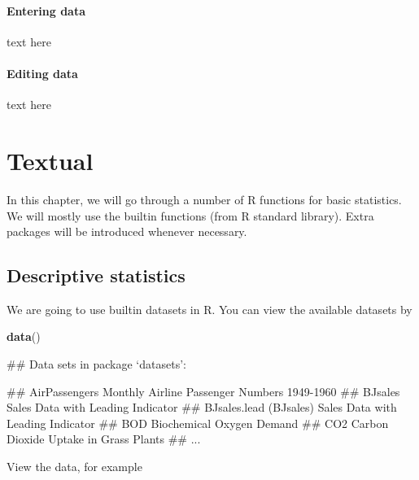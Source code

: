 \documentclass[]{book}
\newenvironment{Shaded}{\begin{snugshade}}{\end{snugshade}}
\newcommand{\KeywordTok}[1]{\textcolor[rgb]{0.13,0.29,0.53}{\textbf{#1}}}
\newcommand{\NormalTok}[1]{#1}
\theoremstyle{definition}
\theoremstyle{definition}
\theoremstyle{remark}
\begin{document}
\subsubsection{Entering data}\label{entering-data}

text here

\subsubsection{Editing data}\label{editing-data}

text here

\chapter{Textual}\label{textual}

In this chapter, we will go through a number of R functions for basic
statistics. We will mostly use the builtin functions (from R standard
library). Extra packages will be introduced whenever necessary.

\section{Descriptive statistics}\label{descriptive-statistics}

We are going to use builtin datasets in R. You can view the available
datasets by

\begin{Shaded}
\begin{Highlighting}[]
\KeywordTok{data}\NormalTok{()}
\end{Highlighting}
\end{Shaded}

\begin{Shaded}
\begin{Highlighting}[]
\NormalTok{## Data sets in package ‘datasets’:}

\NormalTok{## AirPassengers                     Monthly Airline Passenger Numbers 1949-1960}
\NormalTok{## BJsales                           Sales Data with Leading Indicator}
\NormalTok{## BJsales.lead (BJsales)            Sales Data with Leading Indicator}
\NormalTok{## BOD                               Biochemical Oxygen Demand}
\NormalTok{## CO2                               Carbon Dioxide Uptake in Grass Plants}
\NormalTok{## ...}
\end{Highlighting}
\end{Shaded}

View the data, for example
\end{document}

